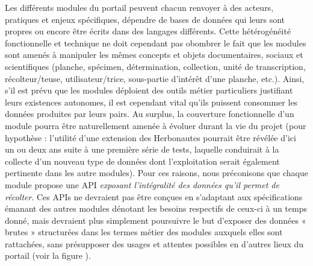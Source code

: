 \startchapter[title={Principes généraux des API dans l'écosystème ReColNat},reference=principes_api]

\startsection[title={Proposition de principe général}]

Les différents modules du portail peuvent chacun renvoyer à des acteurs, pratiques et enjeux spécifiques, dépendre de bases de données qui leurs sont propres ou encore être écrits dans des langages différents.
Cette hétérogénéité fonctionnelle et technique ne doit cependant pas obombrer le fait que les modules sont amenés à manipuler les mêmes concepts et objets documentaires, sociaux et scientifiques (planche, spécimen, détermination, collection, unité de transcription, récolteur/teuse, utilisateur/trice, sous-partie d'intérêt d'une planche, etc.).
Ainsi, s'il est prévu que les modules déploient des outils métier particuliers justifiant leurs existences autonomes, il est cependant vital qu'ils puissent consommer les données produites par leurs pairs.
Au surplus, la couverture fonctionnelle d'un module pourra être naturellement amenée à évoluer durant la vie du projet (pour hypothèse : l'utilité d'une extension des Herbonautes pourrait être révélée d'ici un ou deux ans suite à une première série de tests, laquelle conduirait à la collecte d'un nouveau type de données dont l'exploitation serait également pertinente dans les autre modules).
Pour ces raisons, nous préconisons que chaque module propose une API {\it exposant l'intégralité des données qu'il permet de récolter}.
Ces APIs ne devraient pas être conçues en s'adaptant aux spécifications émanant des autres modules dénotant les besoins respectifs de ceux-ci à un temps donné, mais devraient plus simplement poursuivre le but d'exposer des données « brutes » structurées dans les termes métier des modules auxquels elles sont rattachées, sans présupposer des usages et attentes possibles en d'autres lieux du portail (voir la figure \in[f:apis]).


\startsection[title={Avantages futurs en terme de gestion de projet}]

